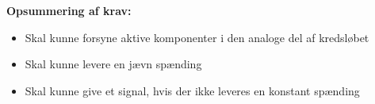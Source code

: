 \vspace{3mm}
\textbf{Opsummering af krav:}
\begin{itemize} 
\item[\text{\sffamily \checkmark}] Skal kunne forsyne aktive komponenter i den analoge del af kredsløbet
\item[\text{\sffamily \checkmark}] Skal kunne levere en jævn spænding
\item[\text{\sffamily \checkmark}] Skal kunne give et signal, hvis der ikke leveres en konstant spænding
\end{itemize}

